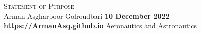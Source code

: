 \documentclass[a4,25pt]{article}
\def\Vrulefill#1#2{
    \vspace{-10pt}
    \leavevmode%
    \leaders%
    \vtop{\hsize=.0025in\vskip#1#2}%
    \hfill%
    \vspace{-2pt}
}
\begin{document}
{{\huge \scshape Statement of Purpose}}\\
\large{Arman Asgharpoor Golroudbari} \hfill { \small \textbf{10 December 2022}} \\

\href{https://ArmanAsq.github.io}{\textbf{\small{https://ArmanAsq.github.io}}}
\hfill {Aeronautics and Astronautics}\\

\Vrulefill{-.05in}{-}
\justifying
\end{document}
